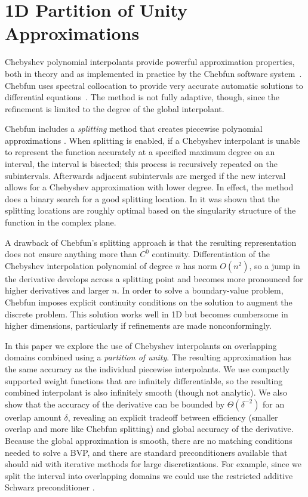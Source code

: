 %
%
\chapter{1D Partition of Unity Approximations}
Chebyshev polynomial interpolants provide powerful approximation properties, both in theory and as implemented in practice by the Chebfun software system~\cite{battles2004extension}. Chebfun uses spectral collocation to provide very accurate automatic solutions to differential equations~\cite{driscoll2008chebop}. The method is not fully adaptive, though, since the refinement is limited to the degree of the global interpolant. 

 Chebfun includes a \textit{splitting} method that creates piecewise polynomial approximations \cite{pachon2010piecewise}. When splitting is enabled, if a Chebyshev interpolant is unable to represent the function accurately at a specified maximum degree on an interval, the interval is bisected; this process is recursively repeated on the subintervals. Afterwards adjacent subintervals are merged if the new interval allows for a Chebyshev approximation with lower degree. In effect, the method does a binary search for a good splitting location. In \cite{driscoll2014optimal} it was shown that the splitting locations are roughly optimal based on the singularity structure of the function in the complex plane. 

A drawback of Chebfun's splitting approach is that the resulting representation does not ensure anything more than $C^0$ continuity. Differentiation of the Chebyshev interpolation polynomial of degree $n$ has norm $O(n^2)$, so a jump in the derivative develops across a splitting point and becomes more pronounced for higher derivatives and larger $n$. In order to solve a boundary-value problem, Chebfun imposes explicit continuity conditions on the solution to augment the discrete problem. This solution works well in 1D but becomes cumbersome in higher dimensions, particularly if refinements are made nonconformingly.

In this paper we explore the use of Chebyshev interpolants on overlapping domains combined using a \emph{partition of unity}. The resulting approximation has the same accuracy as the individual piecewise interpolants. We use compactly supported weight functions that are infinitely differentiable, so the resulting combined interpolant is also infinitely smooth (though not analytic). We also show that the accuracy of the derivative can be bounded by $\Theta(\delta^{-2})$ for an overlap amount $\delta$, revealing an explicit tradeoff between efficiency (smaller overlap and more like Chebfun splitting) and global accuracy of the derivative. Because the global approximation is smooth, there are no matching conditions needed to solve a BVP, and there are standard preconditioners available that should aid with iterative methods for large discretizations. For example, since we split the interval into overlapping domains we could use the restricted additive Schwarz preconditioner \cite{doi:10.1137/S106482759732678X}.

